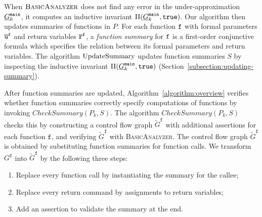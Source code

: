When $\textsc{BasicAnalyzer}$ does not find any error in the
under-approximation $\underline{G}^{\mathtt{{main}}}_k$, it computes an inductive
invariant $\Pi (\underline{G}^{\mathtt{{main}}}_k, \mathtt{true})$. Our algorithm then updates
summaries of functions in $P$. For each function $\mathtt{{f}}$ with
formal parameters $\overline{\mathtt{u}}^{\mathtt{{f}}}$ and return
variables $\overline{\mathtt{r}}^{\mathtt{{f}}}$, a \emph{function summary} for
$\mathtt{{f}}$ is a 
first-order conjunctive formula which specifies the relation between
its formal parameters and return variables. The algorithm
$\textmd{UpdateSummary}$ updates function summaries $S$ by inspecting
the inductive invariant $\Pi (\underline{G}^{\mathtt{{main}}}_k, \mathtt{true})$
(Section~\ref{subsection:updating-summary}). 

After function summaries are updated, Algorithm~\ref{algorithm:overview} 
verifies whether function summaries correctly specify computations of
functions by invoking $\mathit{CheckSummary} (P_k, S)$. The algorithm
$\mathit{CheckSummary} (P_k, S)$ checks this by constructing a control flow 
graph $\tilde{G}^{\mathtt{f}}$ with additional assertions for each
function $\mathtt{f}$, and verifying $\tilde{G}^{\mathtt{f}}$ with
\textsc{BasicAnalyzer}. The control flow graph
$\tilde{G}^{\mathtt{f}}$ is obtained by substituting function
summaries for function calls.
We transform $G^{\mathtt{f}}$ into $\tilde{G}^{\mathtt{f}}$ by the
following three steps:
\begin{enumerate}
\item Replace every function call by instantiating the summary for the
  callee;
\item Replace every return command by assignments to return variables;
\item Add an assertion to validate the summary at the end.
\end{enumerate}
